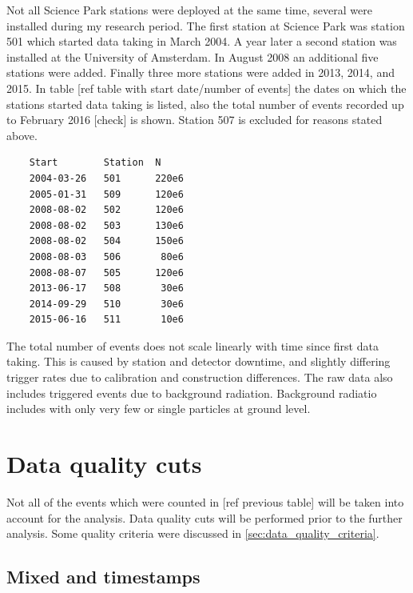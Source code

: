 Not all Science Park stations were deployed at the same time, several were installed during my research period. The first station at Science Park was station 501 which started data taking in March 2004. A year later a second station was installed at the University of Amsterdam. In August 2008 an additional five stations were added. Finally three more stations were added in 2013, 2014, and 2015. In table [ref table with start date/number of events] the dates on which the stations started data taking is listed, also the total number of events recorded up to February 2016 [check] is shown. Station 507 is excluded for reasons stated above.

\begin{verbatim}
    Start        Station  N
    2004-03-26   501      220e6
    2005-01-31   509      120e6
    2008-08-02   502      120e6
    2008-08-02   503      130e6
    2008-08-02   504      150e6
    2008-08-03   506       80e6
    2008-08-07   505      120e6
    2013-06-17   508       30e6
    2014-09-29   510       30e6
    2015-06-16   511       10e6
\end{verbatim}

The total number of events does not scale linearly with time since first data taking. This is caused by station and detector downtime, and slightly differing trigger rates due to calibration and construction differences. The raw data also includes triggered events due to background radiation. Background radiatio includes \eas with only very few or single particles at ground level.


\section{Data quality cuts}

Not all of the events which were counted in [ref previous table] will be taken into account for the analysis. Data quality cuts will be performed prior to the further analysis. Some quality criteria were discussed in \cref{sec:data_quality_criteria}.


\subsection{Mixed \utc and \gps timestamps}


